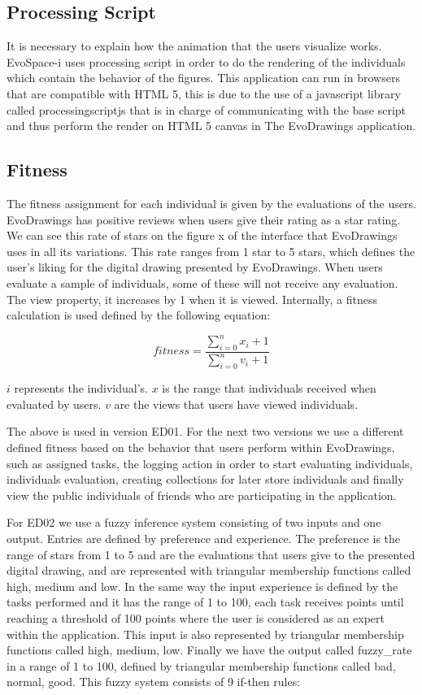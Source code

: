 \subsection{Processing Script}  It is necessary to explain how the animation
that the users visualize works. EvoSpace-i uses processing script in order to do
the rendering of the individuals which contain the behavior of the figures. This
application can run in browsers that are compatible with HTML 5, this is due to
the use of a javascript library called processingscriptjs that is in charge of
communicating with the base script and thus perform the render on HTML 5 canvas
in The EvoDrawings application.

\subsection{Fitness} The fitness assignment for each individual is given by the
evaluations of the users. EvoDrawings has positive reviews when users give their
rating as a star rating. We can see this rate of stars on the figure x of the
interface that EvoDrawings uses in all its variations. This rate ranges from 1
star to 5 stars, which defines the user's liking for the digital drawing
presented by EvoDrawings. When users evaluate a sample of individuals, some of
these will not receive any evaluation. The view property, it increases by 1 when
it is viewed. Internally, a fitness calculation is used defined by the following
equation:

\begin{equation}\label{eq:fitfunc01}
\displaystyle fitness=\frac{\sum_{i=0}^{n}x_{i}+ 1}{\sum_{i=0}^{n}v_{i} + 1}
\end{equation}

$i$ represents the individual's.
$x$ is the range that individuals received when evaluated by users.
$v$ are the views that users have viewed individuals.

The above is used in version ED01. For the next two versions we use a different
defined fitness based on the behavior that users perform within EvoDrawings,
such as assigned tasks, the logging action in order to start evaluating
individuals, individuals evaluation, creating collections for later store
individuals and finally view the public individuals of friends who are
participating in the application.

For ED02 we use a fuzzy inference system consisting of two inputs and one
output. Entries are defined by preference and experience. The preference is the
range of stars from 1 to 5 and are the evaluations that users give to the
presented digital drawing, and are represented with triangular membership
functions called high, medium and low. In the same way the input experience is
defined by the tasks performed and it has the range of 1 to 100, each task
receives points until reaching a threshold of 100 points where the user is
considered as an expert within the application. This input is also represented
by triangular membership functions called high, medium, low. Finally we have the
output called fuzzy\_rate in a range of 1 to 100, defined by triangular
membership functions called bad, normal, good. This fuzzy system consists of 9
if-then rules:

